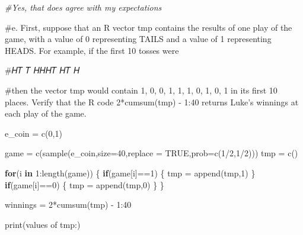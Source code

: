 \documentclass[
]{article}
\newenvironment{Shaded}{\begin{snugshade}}{\end{snugshade}}
\newcommand{\AttributeTok}[1]{\textcolor[rgb]{0.77,0.63,0.00}{#1}}
\newcommand{\CommentTok}[1]{\textcolor[rgb]{0.56,0.35,0.01}{\textit{#1}}}
\newcommand{\ConstantTok}[1]{\textcolor[rgb]{0.00,0.00,0.00}{#1}}
\newcommand{\ControlFlowTok}[1]{\textcolor[rgb]{0.13,0.29,0.53}{\textbf{#1}}}
\newcommand{\DecValTok}[1]{\textcolor[rgb]{0.00,0.00,0.81}{#1}}
\newcommand{\FunctionTok}[1]{\textcolor[rgb]{0.00,0.00,0.00}{#1}}
\newcommand{\NormalTok}[1]{#1}
\newcommand{\OtherTok}[1]{\textcolor[rgb]{0.56,0.35,0.01}{#1}}
\newcommand{\SpecialCharTok}[1]{\textcolor[rgb]{0.00,0.00,0.00}{#1}}
\newcommand{\StringTok}[1]{\textcolor[rgb]{0.31,0.60,0.02}{#1}}
\begin{document}
\begin{Shaded}
\begin{Highlighting}[]
\CommentTok{\#Yes, that does agree with my expectations}
\end{Highlighting}
\end{Shaded}

\#e. First, suppose that an R vector tmp contains the results of one
play of the game, with a value of 0 representing TAILS and a value of 1
representing HEADS. For example, if the first 10 tosses were

\#𝐻𝑇 𝑇 𝐻𝐻𝐻𝑇 𝐻𝑇 𝐻

\#then the vector tmp would contain 1, 0, 0, 1, 1, 1, 0, 1, 0, 1 in its
first 10 places. Verify that the R code 2*cumsum(tmp) - 1:40 returns
Luke's winnings at each play of the game.

\begin{Shaded}
\begin{Highlighting}[]
\NormalTok{e\_coin }\OtherTok{=} \FunctionTok{c}\NormalTok{(}\DecValTok{0}\NormalTok{,}\DecValTok{1}\NormalTok{)}

\NormalTok{game }\OtherTok{=} \FunctionTok{c}\NormalTok{(}\FunctionTok{sample}\NormalTok{(e\_coin,}\AttributeTok{size=}\DecValTok{40}\NormalTok{,}\AttributeTok{replace =} \ConstantTok{TRUE}\NormalTok{,}\AttributeTok{prob=}\FunctionTok{c}\NormalTok{(}\DecValTok{1}\SpecialCharTok{/}\DecValTok{2}\NormalTok{,}\DecValTok{1}\SpecialCharTok{/}\DecValTok{2}\NormalTok{)))}
\NormalTok{tmp }\OtherTok{=} \FunctionTok{c}\NormalTok{()}

\ControlFlowTok{for}\NormalTok{(i }\ControlFlowTok{in} \DecValTok{1}\SpecialCharTok{:}\FunctionTok{length}\NormalTok{(game))}
\NormalTok{\{}
  \ControlFlowTok{if}\NormalTok{(game[i]}\SpecialCharTok{==}\DecValTok{1}\NormalTok{)}
\NormalTok{  \{}
\NormalTok{    tmp }\OtherTok{=} \FunctionTok{append}\NormalTok{(tmp,}\DecValTok{1}\NormalTok{)}
\NormalTok{  \}}
  \ControlFlowTok{if}\NormalTok{(game[i]}\SpecialCharTok{==}\DecValTok{0}\NormalTok{)}
\NormalTok{  \{}
\NormalTok{    tmp }\OtherTok{=} \FunctionTok{append}\NormalTok{(tmp,}\DecValTok{0}\NormalTok{)}
\NormalTok{  \}}
\NormalTok{\}}

\NormalTok{winnings }\OtherTok{=} \DecValTok{2}\SpecialCharTok{*}\FunctionTok{cumsum}\NormalTok{(tmp) }\SpecialCharTok{{-}} \DecValTok{1}\SpecialCharTok{:}\DecValTok{40}

\FunctionTok{print}\NormalTok{(}\StringTok{\textquotesingle{}values of tmp:\textquotesingle{}}\NormalTok{)}
\end{Highlighting}
\end{Shaded}
\end{document}
